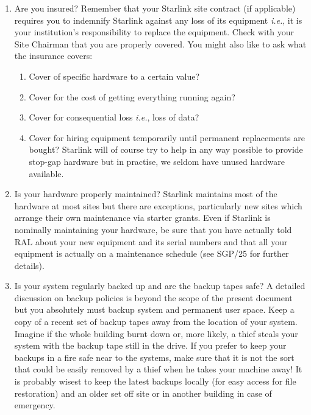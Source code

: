 \documentclass[11pt]{article}
\newcommand{\xref}[3]{#1}
\begin{document}
\begin{enumerate}

\item Are you insured? Remember that your Starlink site contract (if
applicable) requires you to indemnify Starlink against any loss of
its equipment \emph{i.e.}, it is your institution's responsibility to
replace the equipment. Check with your Site Chairman that you are
properly covered.  You might also like to ask what the insurance
covers:

\begin{enumerate}

\item Cover of specific hardware to a certain value?

\item Cover for the cost of getting everything running again?

\item Cover for consequential loss \emph{i.e.}, loss of data?

\item Cover for hiring equipment temporarily until permanent replacements
are bought? Starlink will of course try to help in any way possible to
provide stop-gap hardware but in practise, we seldom have unused hardware
available.

\end{enumerate}

\item Is your hardware properly maintained? Starlink maintains most of
the hardware at most sites but there are exceptions, particularly
new sites which arrange their own maintenance via starter grants.
Even if Starlink is nominally maintaining your hardware, be sure that
you have actually told RAL about your new equipment and its serial numbers
and that all your equipment is actually on a maintenance schedule
(see \xref{SGP/25}{sgp25}{} for further details).


\item Is your system regularly backed up and are the backup tapes
safe?  A detailed discussion on backup policies is beyond the scope of
the present document but you absolutely must backup
system and permanent user space. Keep a copy of a recent set of backup
tapes away from the location of your system. Imagine if the whole
building burnt down or, more likely, a thief steals your system with
the backup tape still in the drive. If you prefer to keep your backups
in a fire safe near to the systems, make sure that it is not the sort
that could be easily removed by a thief when he takes your machine away!
It is probably wisest to keep the latest backups locally (for easy access
for file restoration) and an older set off site or in another building
in case of emergency.


\end{enumerate}
\end{document}
